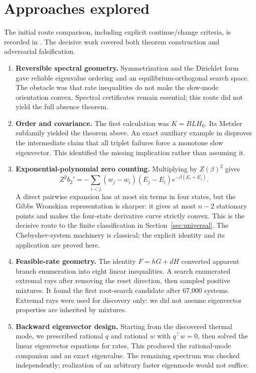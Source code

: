 \documentclass[11pt]{article}
\begin{document}
\section{Approaches explored}
The initial route comparison, including explicit continue/change criteria, is recorded in . The decisive work covered both theorem construction and adversarial falsification.
\begin{enumerate}
\item \textbf{Reversible spectral geometry.} Symmetrization and the Dirichlet form gave reliable eigenvalue ordering and an equilibrium-orthogonal search space. The obstacle was that rate inequalities do not make the slow-mode orientation convex. Spectral certificates remain essential; this route did not yield the full absence theorem.
\item \textbf{Order and covariance.} The first calculation was $K=BLH_0$. Its Metzler subfamily yielded the theorem above. An exact auxiliary example in  disproves the intermediate claim that all triplet failures force a monotone slow eigenvector. This identified the missing implication rather than assuming it.
\item \textbf{Exponential-polynomial zero counting.} Multiplying by $Z(\beta)^2$ gives
\[
Z^2b_2'=-\sum_{i<j}(w_j-w_i)(E_j-E_i)e^{-\beta(E_i+E_j)}.
\]
A direct pairwise expansion has at most six terms in four states, but the Gibbs Wronskian representation is sharper: it gives at most $n-2$ stationary points and makes the four-state derivative curve strictly convex. This is the decisive route to the finite classification in Section~\ref{sec:universal}. The Chebyshev-system machinery is classical; the explicit identity and its application are proved here.
\item \textbf{Feasible-rate geometry.} The identity $F=hG+dH$ converted apparent branch enumeration into eight linear inequalities. A search enumerated extremal rays after removing the reset direction, then sampled positive mixtures. It found the first root-search candidate after 67,000 systems. Extremal rays were used for discovery only: we did not assume eigenvector properties are inherited by mixtures.
\item \textbf{Backward eigenvector design.} Starting from the discovered thermal mode, we prescribed rational $q$ and rational $w$ with $q^\top w=0$, then solved the linear eigenvector equations for rates. This produced the rational-mode companion and an exact eigenvalue. The remaining spectrum was checked independently; realization of an arbitrary faster eigenmode would not suffice.

\end{enumerate}
\end{document}
